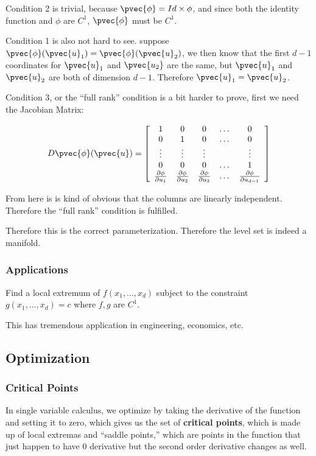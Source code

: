 \documentclass[11 pt, twoside]{article}
\begin{document}
Condition 2 is trivial, because $\pvec{\phi} = Id \times \phi$, and since both
the identity function and $\phi$ are $C^1$, $\pvec{\phi}$ must be $C^1$.

Condition 1 is also not hard to see. suppose $\pvec{\phi}(\pvec{u}_1) =
\pvec{\phi}(\pvec{u}_2)$, we then know that the first $d-1$ coordinates for
$\pvec{u}_1$ and $\pvec{u_2}$ are the same, but $\pvec{u}_1$ and $\pvec{u}_2$ are
both of dimension $d - 1$. Therefore $\pvec{u}_1 = \pvec{u}_2$.

Condition 3, or the ``full rank'' condition is a bit harder to prove, first we
need the Jacobian Matrix:

\[
D\pvec{\phi}(\pvec{u}) =
\left[\begin{array}{ccccc}
1 & 0 & 0 & \dots & 0 \\
0 & 1 & 0 & \dots & 0 \\
\vdots & \vdots & \vdots & & \vdots\\
0 & 0 & 0 & \dots & 1 \\
\frac{\partial \phi}{\partial u_1} & \frac{\partial \phi}{\partial u_2}
& \frac{\partial \phi}{\partial u_3} & \dots &
\frac{\partial \phi}{\partial u_{d - 1}}
\end{array}\right]
\]

From here is is kind of obvious that the columns are linearly independent.
Therefore the ``full rank'' condition is fulfilled.

Therefore this is the correct parameterization. Therefore the level set is indeed a manifold.

\subsubsection{Applications}
Find a local extremum of $f(x_1, \dots, x_d)$ subject to the constraint $g(x_1,
\dots, x_d) = c$ where $f, g$ are $C^1$.

This has tremendous application in engineering, economics, etc.
\subsection{Optimization}
\subsubsection{Critical Points}
In single variable calculus, we optimize by taking the derivative of the
function and setting it to zero, which gives us the set of \textbf{critical
points}, which is made up of local extremas and ``saddle points,'' which are
points in the function that just happen to have 0 derivative but the second
order derivative changes as well.
\end{document}

